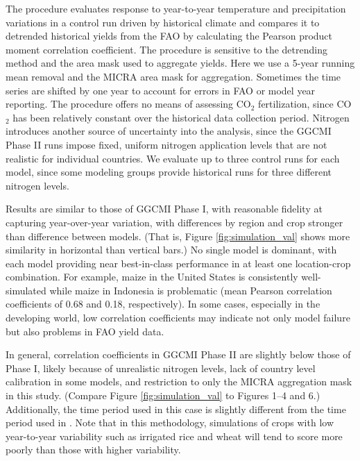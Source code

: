 \documentclass[esd, manuscript]{copernicus} %
\begin{document}
The \citet{muller_global_2017} procedure evaluates response to year-to-year temperature and precipitation variations in a control run driven by historical climate and compares it to detrended historical yields from the FAO \citep{FAOSTAT} by calculating the Pearson product moment correlation coefficient. The procedure is sensitive to the detrending method and the area mask used to aggregate yields. Here we use a 5-year running mean removal and the MICRA area mask for aggregation. Sometimes the time series are shifted by one year to account for errors in FAO or model year reporting. The procedure offers no means of assessing CO$_2$ fertilization, since CO$_2$ has been relatively constant over the historical data collection period. Nitrogen introduces another source of uncertainty into the analysis, since the GGCMI Phase II runs impose fixed, uniform nitrogen application levels that are not realistic for individual countries. We evaluate up to three control runs for each model, since some modeling groups provide historical runs for three different nitrogen levels. 

Results are similar to those of GGCMI Phase I, with reasonable fidelity at capturing year-over-year variation, with differences by region and crop stronger than difference between models. (That is, Figure \ref{fig:simulation_val} shows more similarity in horizontal than vertical bars.) No single model is dominant, with each model providing near best-in-class performance in at least one location-crop combination. For example, maize in the United States is consistently well-simulated while maize in Indonesia is problematic (mean Pearson correlation coefficients of 0.68 and 0.18, respectively). In some cases, especially in the developing world, low correlation coefficients may indicate not only model failure but also problems in FAO yield data. 

In general, correlation coefficients in GGCMI Phase II are slightly below those of Phase I, likely because of unrealistic nitrogen levels, lack of country level calibration in some models, and restriction to only the MICRA aggregation mask in this study. (Compare Figure \ref{fig:simulation_val} to \citet{muller_global_2017} Figures 1--4 and 6.)  Additionally, the time period used in this case is slightly different from the time period used in \citet{muller_global_2017}. Note that in this methodology, simulations of crops with low year-to-year variability such as irrigated rice and wheat will tend to score more poorly than those with higher variability.
\end{document}
